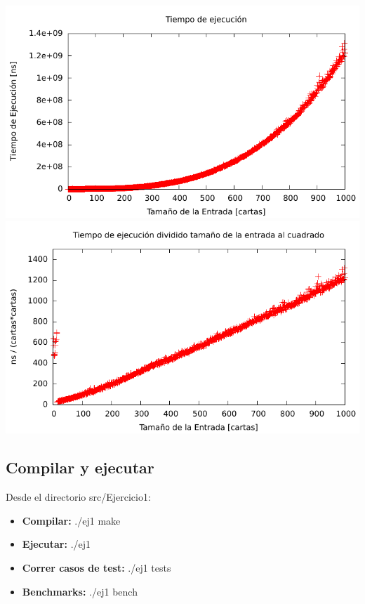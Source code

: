 \includegraphics[width=\textwidth]{ej1/cubico.pdf}
\includegraphics[width=\textwidth]{ej1/lineal.pdf}

\subsection{Compilar y ejecutar}
Desde el directorio src/Ejercicio1:
\begin{itemize}
   \item {\bf Compilar:} ./ej1 make
   \item {\bf Ejecutar:} ./ej1
   \item {\bf Correr casos de test:} ./ej1 tests
   \item {\bf Benchmarks:} ./ej1 bench
\end{itemize}

